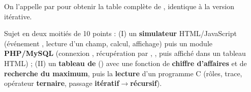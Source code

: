 \noindent On l'appelle par  pour obtenir la table complète de
, identique à la version itérative.

\begin{aretenir}
Sujet en deux moitiés de 10 points : (I) un \textbf{simulateur} HTML/JavaScript
(événement , lecture d'un champ, calcul, affichage) puis un module
\textbf{PHP/MySQL} (connexion , récupération par ,
, puis  affiché dans un tableau HTML) ; (II) un
\textbf{tableau de } () avec une fonction de
\textbf{chiffre d'affaires} et de \textbf{recherche du maximum}, puis la
\textbf{lecture} d'un programme C (rôles, trace, opérateur \textbf{ternaire},
passage \textbf{itératif$\rightarrow$récursif}).
\end{aretenir}
